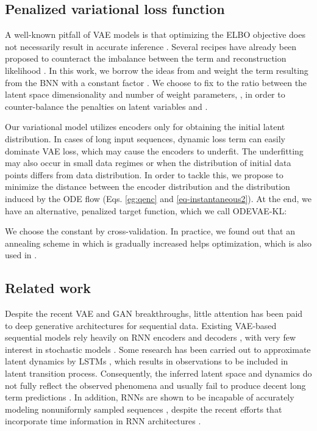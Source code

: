 \documentclass{article}
\newcommand{\0}{\mathbf{0}}
\begin{document}
\subsection{Penalized variational loss function}
A well-known pitfall of VAE models is that optimizing the ELBO objective does not necessarily result in accurate  inference \citep{alemi2017fixing}. Several recipes have already been proposed to counteract the imbalance between the  term and reconstruction likelihood \citep{zhao2017infovae,higgins2017beta}. In this work, we borrow the ideas from \cite{higgins2017beta} and weight the  term resulting from the BNN with a constant factor . We choose to fix  to the ratio between the latent space dimensionality and number of weight parameters, , in order to counter-balance the penalties on latent variables  and . 

Our variational model utilizes encoders only for obtaining the initial latent distribution. In cases of long input sequences, dynamic loss term can easily dominate VAE loss, which may cause the encoders to underfit. The underfitting may also occur in small data regimes or when the distribution of initial data points differs from data distribution. In order to tackle this, we propose to minimize the distance between the encoder distribution and the distribution induced by the ODE flow (Eqs. \ref{eg:qenc} and \ref{eq-instantaneous2}). At the end, we have an alternative, penalized target function, which we call ODEVAE-KL:

We choose the constant  by cross-validation. In practice, we found out that an annealing scheme in which  is gradually increased helps optimization, which is also used in \citep{karl2016deep,rezende2015variational}.


\subsection{Related work}
Despite the recent VAE and GAN breakthroughs, little attention has been paid to deep generative architectures for sequential data. Existing VAE-based sequential models rely heavily on RNN encoders and decoders \citep{chung2015recurrent,serban2017hierarchical}, with very few interest in stochastic models \citep{fraccaro2016sequential}. Some research has been carried out to approximate latent dynamics by LSTMs \citep{lotter2016deep,hsu2017unsupervised,li2018disentangled}, which results in observations to be included in latent transition process. Consequently, the inferred latent space and dynamics do not fully reflect the observed phenomena and usually fail to produce decent long term predictions \citep{karl2016deep}. In addition, RNNs are shown to be incapable of accurately modeling nonuniformly sampled sequences \citep{chen2018neural}, despite the recent efforts that incorporate time information in RNN architectures \citep{li2017time,xiao2018learning}.
\end{document}
